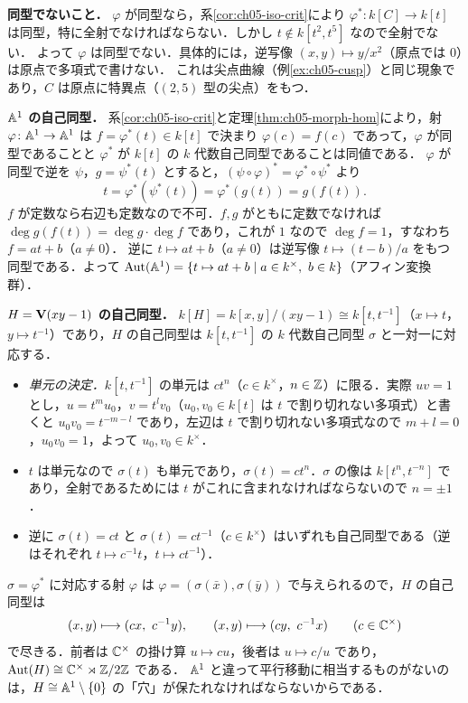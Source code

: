 \textbf{同型でないこと．}
$\varphi$ が同型なら，系\ref{cor:ch05-iso-crit}により $\varphi^*\colon k[C]\to k[t]$ は同型，特に全射でなければならない．しかし $t\notin k[t^2,t^5]$ なので全射でない．
よって $\varphi$ は同型でない．具体的には，逆写像 $(x,y)\mapsto y/x^2$（原点では $0$）は原点で多項式で書けない．
これは尖点曲線（例\ref{ex:ch05-cusp}）と同じ現象であり，$C$ は原点に特異点（$(2,5)$ 型の尖点）をもつ．

\textbf{$\mathbb{A}^1$ の自己同型．}
系\ref{cor:ch05-iso-crit}と定理\ref{thm:ch05-morph-hom}により，射 $\varphi\colon\mathbb{A}^1\to\mathbb{A}^1$ は $f=\varphi^*(t)\in k[t]$ で決まり $\varphi(c)=f(c)$ であって，$\varphi$ が同型であることと $\varphi^*$ が $k[t]$ の $k$ 代数自己同型であることは同値である．
$\varphi$ が同型で逆を $\psi$，$g=\psi^*(t)$ とすると，$(\psi\circ\varphi)^*=\varphi^*\circ\psi^*$ より
\[
  t=\varphi^*(\psi^*(t))=\varphi^*(g(t))=g(f(t)).
\]
$f$ が定数なら右辺も定数なので不可．$f,g$ がともに定数でなければ $\deg g(f(t))=\deg g\cdot\deg f$ であり，これが $1$ なので $\deg f=1$，すなわち $f=at+b$（$a\ne0$）．
逆に $t\mapsto at+b$（$a\ne0$）は逆写像 $t\mapsto(t-b)/a$ をもつ同型である．よって $\operatorname{Aut}(\mathbb{A}^1)=\{t\mapsto at+b\mid a\in k^\times,\ b\in k\}$（アフィン変換群）．

\textbf{$H=\mathbf{V}(xy-1)$ の自己同型．}
$k[H]=k[x,y]/(xy-1)\cong k[t,t^{-1}]$（$x\mapsto t$，$y\mapsto t^{-1}$）であり，$H$ の自己同型は $k[t,t^{-1}]$ の $k$ 代数自己同型 $\sigma$ と一対一に対応する．
\begin{itemize}
  \item \emph{単元の決定．}$k[t,t^{-1}]$ の単元は $ct^n$（$c\in k^\times$，$n\in\mathbb{Z}$）に限る．実際 $uv=1$ とし，$u=t^mu_0$，$v=t^lv_0$（$u_0,v_0\in k[t]$ は $t$ で割り切れない多項式）と書くと $u_0v_0=t^{-m-l}$ であり，左辺は $t$ で割り切れない多項式なので $m+l=0$，$u_0v_0=1$，よって $u_0,v_0\in k^\times$．
  \item $t$ は単元なので $\sigma(t)$ も単元であり，$\sigma(t)=ct^n$．$\sigma$ の像は $k[t^n,t^{-n}]$ であり，全射であるためには $t$ がこれに含まれなければならないので $n=\pm1$．
  \item 逆に $\sigma(t)=ct$ と $\sigma(t)=ct^{-1}$（$c\in k^\times$）はいずれも自己同型である（逆はそれぞれ $t\mapsto c^{-1}t$，$t\mapsto ct^{-1}$）．
\end{itemize}
$\sigma=\varphi^*$ に対応する射 $\varphi$ は $\varphi=(\sigma(\bar x),\sigma(\bar y))$ で与えられるので，$H$ の自己同型は
\[
  (x,y)\longmapsto(cx,\ c^{-1}y),\qquad (x,y)\longmapsto(cy,\ c^{-1}x)\qquad(c\in\C^\times)
\]
で尽きる．前者は $\mathbb{C}^\times$ の掛け算 $u\mapsto cu$，後者は $u\mapsto c/u$ であり，$\operatorname{Aut}(H)\cong\mathbb{C}^\times\rtimes\mathbb{Z}/2\mathbb{Z}$ である．
$\mathbb{A}^1$ と違って平行移動に相当するものがないのは，$H\cong\mathbb{A}^1\setminus\{0\}$ の「穴」が保たれなければならないからである．

